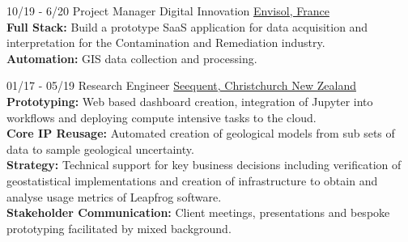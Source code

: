 \documentclass[]{friggeri-cv}
\begin{document}
\begin{entrylist}
 	\entry
	{10/19 - 6/20}
	{Project Manager Digital Innovation}
	{\href{http://envisol.net/}{Envisol, France}}
	{
	\\[-0.5em]
	\textbf{Full Stack: } Build a prototype SaaS application for data acquisition and interpretation for the Contamination and Remediation industry.
	\\[3pt]
	\textbf{Automation: } GIS data collection and processing.
	}
  
 	\entry
    {01/17 - 05/19}
    {Research Engineer}
    {\href{https://www.seequent.com/}{Seequent, Christchurch New Zealand}}
    {
    \\[-0.5em]
   	\textbf{Prototyping: }Web based dashboard creation, integration of Jupyter into workflows and deploying compute intensive tasks to the cloud.
   	\\[3pt]
   	\textbf{Core IP Reusage: }Automated creation of geological models from sub sets of data to sample geological uncertainty.
    \\[3pt]
   	\textbf{Strategy: }Technical support for key business decisions including verification of geostatistical implementations and creation of infrastructure to obtain and analyse usage metrics of Leapfrog software. 
    \\[3pt]
	\textbf{Stakeholder Communication: }Client meetings, presentations and bespoke prototyping facilitated by mixed background.
	}
  

    

\end{entrylist}
\end{document}
